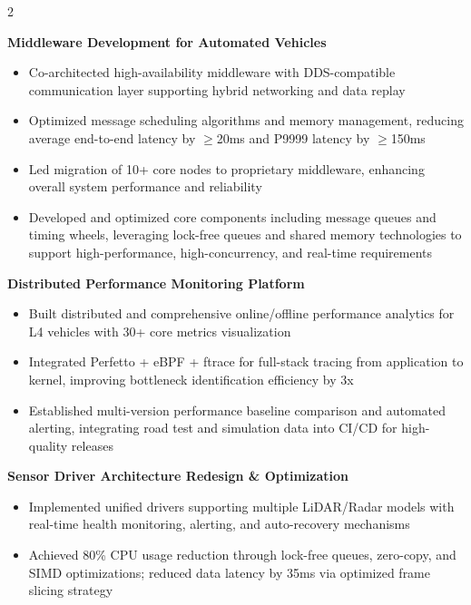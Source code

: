 \documentclass[10pt,a4paper,ragged2e,withhyper]{altacv}
\begin{document}
\begin{paracol}{2}



\textbf{Middleware Development for Automated Vehicles}
\begin{itemize}
\item Co-architected high-availability middleware with DDS-compatible communication layer supporting hybrid networking and data replay
\item Optimized message scheduling algorithms and memory management, reducing average end-to-end latency by $\geq$20ms and P9999 latency by $\geq$150ms
\item Led migration of 10+ core nodes to proprietary middleware, enhancing overall system performance and reliability
\item Developed and optimized core components including message queues and timing wheels, leveraging lock-free queues and shared memory technologies to support high-performance, high-concurrency, and real-time requirements
\end{itemize}

\textbf{Distributed Performance Monitoring Platform}
\begin{itemize}
\item Built distributed and comprehensive online/offline performance analytics for L4 vehicles with 30+ core metrics visualization
\item Integrated Perfetto + eBPF + ftrace for full-stack tracing from application to kernel, improving bottleneck identification efficiency by 3x
\item Established multi-version performance baseline comparison and automated alerting, integrating road test and simulation data into CI/CD for high-quality releases
\end{itemize}

\textbf{Sensor Driver Architecture Redesign \& Optimization}
\begin{itemize}
\item Implemented unified drivers supporting multiple LiDAR/Radar models with real-time health monitoring, alerting, and auto-recovery mechanisms
\item Achieved 80\% CPU usage reduction through lock-free queues, zero-copy, and SIMD optimizations; reduced data latency by 35ms via optimized frame slicing strategy 
\end{itemize}


\end{paracol}
\end{document}
